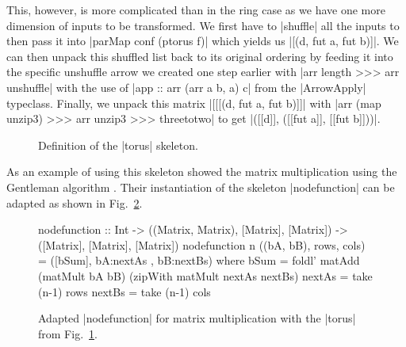 This, however, is more complicated than in the ring case as we have one more dimension of inputs to be transformed. We first have to |shuffle| all the inputs to then pass it into |parMap conf (ptorus f)| which yields us |[(d, fut a, fut b)]|. We can then unpack this shuffled list back to its original ordering by feeding it into the specific unshuffle arrow we created one step earlier with |arr length >>> arr unshuffle| with the use of |app :: arr (arr a b, a) c| from the |ArrowApply| typeclass. Finally, we unpack this matrix |[[[(d, fut a, fut b)]]| with |arr (map unzip3) >>> arr unzip3 >>> threetotwo| to get  |([[d]], ([[fut a]], [[fut b]]))|.

\begin{figure}[h]
\caption{Definition of the |torus| skeleton.}
\label{fig:torus}
\end{figure}
As an example of using this skeleton \citep{Loogen2012} showed the matrix multiplication using the Gentleman algorithm \citep{Gentleman1978}. Their instantiation of the skeleton |nodefunction| can be adapted as shown in Fig.~\ref{fig:torusMatMult}.
\begin{figure}[h]
\begin{code}
nodefunction :: Int -> ((Matrix, Matrix), [Matrix], [Matrix]) -> ([Matrix], [Matrix], [Matrix])
nodefunction n ((bA, bB), rows, cols) = ([bSum], bA:nextAs , bB:nextBs)
		where bSum = foldl' matAdd (matMult bA bB) (zipWith matMult nextAs nextBs)
			     nextAs = take (n-1) rows
			     nextBs = take (n-1) cols
\end{code}
\caption{Adapted |nodefunction| for matrix multiplication with the |torus| from Fig.~\ref{fig:torus}.}
\label{fig:torusMatMult}
\end{figure}
